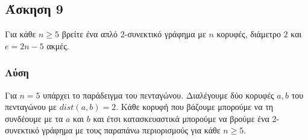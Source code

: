 \subsection*{Άσκηση 9}

Για κάθε $n \ge 5$ βρείτε ένα απλό 2-συνεκτικό γράφημα με $n$ κορυφές, διάμετρο $2$ και $e = 2n-5$ ακμές.

\subsubsection*{Λύση}

Για $n=5$ υπάρχει το παράδειγμα του πενταγώνου. Διαλέγουμε δύο κορυφές $a,b$ του πενταγώνου με $dist(a,b)=2$. Κάθε κορυφή που βάζουμε μπορούμε να τη συνδέουμε με τα $a$ και $b$
και έτσι κατασκευαστικά μπορούμε να βρούμε ένα 2-συνεκτικό γράφημα με τους παραπάνω περιορισμούς για κάθε $n \ge 5$.




